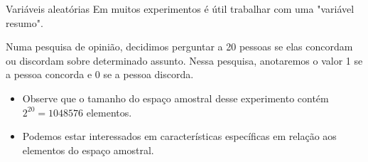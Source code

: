 \begin{frame}{Variáveis aleatórias}
    Em muitos experimentos é útil trabalhar com uma "variável resumo".

    \begin{exemplo}[8]
        Numa pesquisa de opinião, decidimos perguntar a 20 pessoas se elas concordam ou discordam sobre determinado assunto. Nessa pesquisa, anotaremos o valor 1 se a pessoa concorda e 0 se a pessoa discorda.

        \begin{itemize}
            \item Observe que o tamanho do espaço amostral desse experimento contém $2^{20}=1048576$ elementos.
            \item Podemos estar interessados em características específicas em relação aos elementos do espaço amostral. 
        \end{itemize}
    \end{exemplo}
\end{frame}

